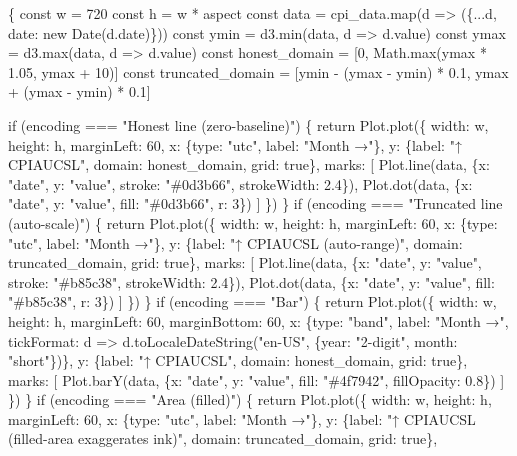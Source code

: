\documentclass[
  letterpaper,
  11pt,
  twoside,
  openany]{scrbook}
\newenvironment{Shaded}{\begin{snugshade}}{\end{snugshade}}
\newcommand{\NormalTok}[1]{\textcolor[rgb]{0.33,0.33,0.33}{#1}}
\begin{document}
\begin{Shaded}
\begin{Highlighting}[]
\NormalTok{\{}
\NormalTok{  const w = 720}
\NormalTok{  const h = w * aspect}
\NormalTok{  const data = cpi\_data.map(d =\textgreater{} (\{...d, date: new Date(d.date)\}))}
\NormalTok{  const ymin = d3.min(data, d =\textgreater{} d.value)}
\NormalTok{  const ymax = d3.max(data, d =\textgreater{} d.value)}
\NormalTok{  const honest\_domain = [0, Math.max(ymax * 1.05, ymax + 10)]}
\NormalTok{  const truncated\_domain = [ymin {-} (ymax {-} ymin) * 0.1, ymax + (ymax {-} ymin) * 0.1]}

\NormalTok{  if (encoding === "Honest line (zero{-}baseline)") \{}
\NormalTok{    return Plot.plot(\{}
\NormalTok{      width: w, height: h, marginLeft: 60,}
\NormalTok{      x: \{type: "utc", label: "Month →"\},}
\NormalTok{      y: \{label: "↑ CPIAUCSL", domain: honest\_domain, grid: true\},}
\NormalTok{      marks: [}
\NormalTok{        Plot.line(data, \{x: "date", y: "value", stroke: "\#0d3b66", strokeWidth: 2.4\}),}
\NormalTok{        Plot.dot(data, \{x: "date", y: "value", fill: "\#0d3b66", r: 3\})}
\NormalTok{      ]}
\NormalTok{    \})}
\NormalTok{  \}}
\NormalTok{  if (encoding === "Truncated line (auto{-}scale)") \{}
\NormalTok{    return Plot.plot(\{}
\NormalTok{      width: w, height: h, marginLeft: 60,}
\NormalTok{      x: \{type: "utc", label: "Month →"\},}
\NormalTok{      y: \{label: "↑ CPIAUCSL (auto{-}range)", domain: truncated\_domain, grid: true\},}
\NormalTok{      marks: [}
\NormalTok{        Plot.line(data, \{x: "date", y: "value", stroke: "\#b85c38", strokeWidth: 2.4\}),}
\NormalTok{        Plot.dot(data, \{x: "date", y: "value", fill: "\#b85c38", r: 3\})}
\NormalTok{      ]}
\NormalTok{    \})}
\NormalTok{  \}}
\NormalTok{  if (encoding === "Bar") \{}
\NormalTok{    return Plot.plot(\{}
\NormalTok{      width: w, height: h, marginLeft: 60, marginBottom: 60,}
\NormalTok{      x: \{type: "band", label: "Month →", tickFormat: d =\textgreater{} d.toLocaleDateString("en{-}US", \{year: "2{-}digit", month: "short"\})\},}
\NormalTok{      y: \{label: "↑ CPIAUCSL", domain: honest\_domain, grid: true\},}
\NormalTok{      marks: [}
\NormalTok{        Plot.barY(data, \{x: "date", y: "value", fill: "\#4f7942", fillOpacity: 0.8\})}
\NormalTok{      ]}
\NormalTok{    \})}
\NormalTok{  \}}
\NormalTok{  if (encoding === "Area (filled)") \{}
\NormalTok{    return Plot.plot(\{}
\NormalTok{      width: w, height: h, marginLeft: 60,}
\NormalTok{      x: \{type: "utc", label: "Month →"\},}
\NormalTok{      y: \{label: "↑ CPIAUCSL (filled{-}area exaggerates ink)", domain: truncated\_domain, grid: true\},}

\end{Highlighting}
\end{Shaded}
\end{document}
